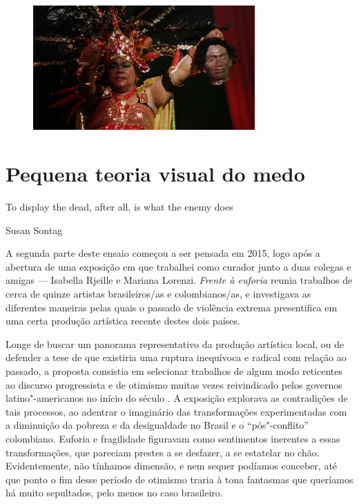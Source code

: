 \pagebreak
\thispagestyle{empty}

\begin{vplace}[.6]
\begin{figure}[!ht]
\centering
 \includegraphics[width=85mm]{./imgs/frame2.jpg}
\caption{\tiny{}}
\end{figure}
\end{vplace}

\pagebreak

\section*{Pequena teoria visual do medo}

\epigraph{To display the dead, after all, is what the enemy does}{Susan Sontag}

A segunda parte deste ensaio começou a ser pensada em 2015, logo após a
abertura de uma exposição em que trabalhei como curador junto a duas
colegas e amigas --- Isabella Rjeille e Mariana Lorenzi. \emph{Frente à
euforia} reunia trabalhos de cerca de quinze artistas brasileiros/as e
colombianos/as, e investigava as diferentes maneiras pelas
quais o passado de violência extrema presentifica em uma certa produção artística
recente destes dois países.

Longe de buscar um panorama representativo da produção artística local,
ou de defender a tese de que existiria uma ruptura inequívoca e radical
com relação ao passado, a proposta consistia em selecionar trabalhos de
algum modo reticentes ao discurso progressista e de otimismo muitas
vezes reivindicado pelos governos latino"-americanos no início do século
. A exposição explorava as contradições de tais processos, ao adentrar
o imaginário das transformações experimentadas com a diminuição da
pobreza e da desigualdade no Brasil e o ``pós"-conflito'' colombiano.
Euforia e fragilidade figuravam como sentimentos inerentes a essas
transformações, que pareciam prestes a se desfazer, a se estatelar no
chão. Evidentemente, não tínhamos dimensão, e nem sequer podíamos
conceber, até que ponto o fim desse período de otimismo traria à tona
fantasmas que queríamos há muito sepultados, pelo menos no caso
brasileiro.

